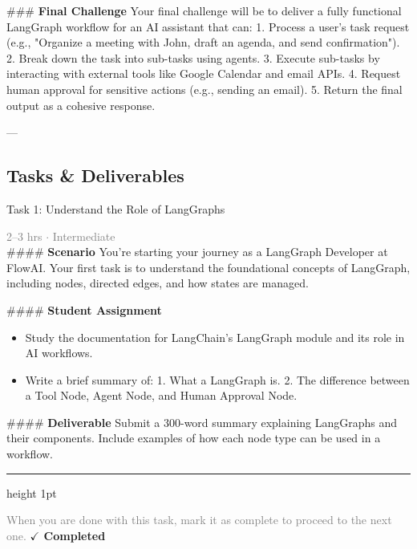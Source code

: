 \documentclass[10pt,a4paper]{article}
\begin{document}
\#\#\# \textbf{Final Challenge}
Your final challenge will be to deliver a fully functional LangGraph workflow for an AI assistant that can:
1. Process a user's task request (e.g., "Organize a meeting with John, draft an agenda, and send confirmation").
2. Break down the task into sub-tasks using agents.
3. Execute sub-tasks by interacting with external tools like Google Calendar and email APIs.
4. Request human approval for sensitive actions (e.g., sending an email).
5. Return the final output as a cohesive response.

---

\subsection*{Tasks \& Deliverables}

\begin{taskbox}{Task 1: Understand the Role of LangGraphs}

    {\small \textcolor{gray}{2--3 hrs $\cdot$ Intermediate}}\\[12pt]

    \#\#\#\# \textbf{Scenario}
You’re starting your journey as a LangGraph Developer at FlowAI. Your first task is to understand the foundational concepts of LangGraph, including nodes, directed edges, and how states are managed.

\#\#\#\# \textbf{Student Assignment}
\begin{itemize}
    \item Study the documentation for LangChain's LangGraph module and its role in AI workflows.
    \item Write a brief summary of:
  1. What a LangGraph is.
  2. The difference between a Tool Node, Agent Node, and Human Approval Node.
\end{itemize}

\#\#\#\# \textbf{Deliverable}
Submit a 300-word summary explaining LangGraphs and their components. Include examples of how each node type can be used in a workflow.\par

    \vspace{16pt}

    \textcolor{cardBorder}{\hrule height 1pt}\vspace{8pt}

    \small \textcolor{gray}{When you are done with this task, mark it as complete to proceed to the next one.} \hfill \textbf{\textcolor{brandDark}{$\checkmark$ Completed}}

\end{taskbox}
\end{document}
